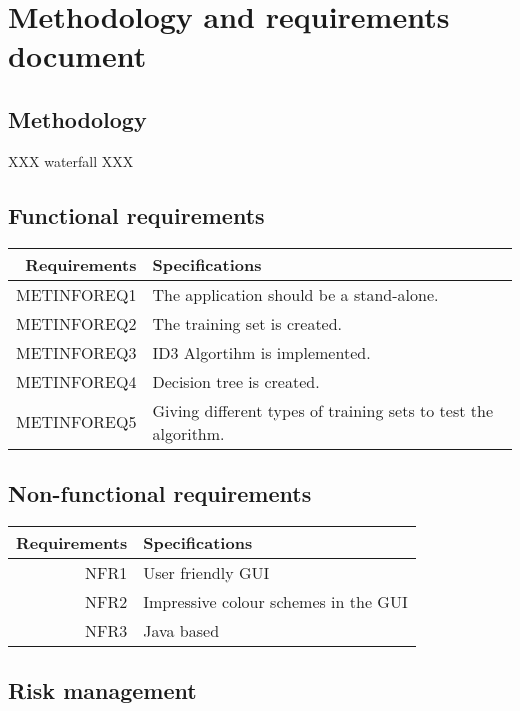 \documentclass{article}
\begin{document}
\section{Methodology and requirements document}
\label{sec:methrecdoc}

\subsection{Methodology}
\label{sec:meth}

XXX waterfall XXX



\subsection{Functional requirements}

\begin{center}
\begin{tabular}{|r|l|}

\hline
Requirements & Specifications\\[5pt]
\hline

METINFOREQ1 &
The application should be a stand-alone.
\\\hline

METINFOREQ2 &
The training set is created.
\\\hline

METINFOREQ3&
ID3 Algortihm is implemented.
\\\hline

METINFOREQ4&
Decision tree is created.
\\\hline

METINFOREQ5&
Giving different types of training sets to test the algorithm.
\\\hline

\end{tabular}
\end{center}

\subsection{Non-functional requirements}

\begin{tabular}{|r|l|}

\hline
Requirements & Specifications\\[5pt]
\hline
NFR1&
User friendly GUI
\\\hline

NFR2&
Impressive colour schemes in the GUI
\\\hline

NFR3&
Java based
\\\hline

\end{tabular}

\subsection{Risk management}
\label{sec:riskman}







\end{document}
